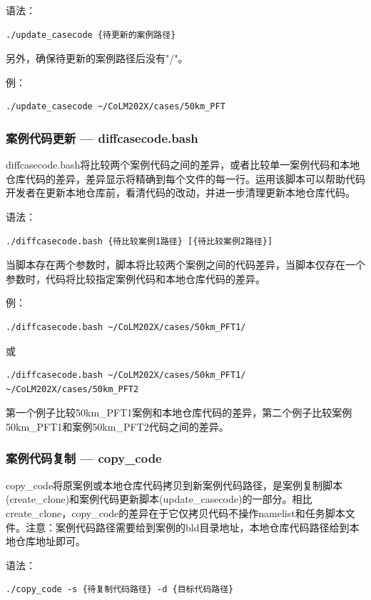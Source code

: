 语法：
\begin{lstlisting}[xleftmargin=2.5em]
./update_casecode {待更新的案例路径}
\end{lstlisting}
另外，确保待更新的案例路径后没有"/"。

例：
\begin{lstlisting}[xleftmargin=2.5em]
./update_casecode ~/CoLM202X/cases/50km_PFT
\end{lstlisting}

\subsubsection{案例代码更新 --- diffcasecode.bash}

diffcasecode.bash将比较两个案例代码之间的差异，或者比较单一案例代码和本地仓库代码的差异，差异显示将精确到每个文件的每一行。运用该脚本可以帮助代码开发者在更新本地仓库前，看清代码的改动，并进一步清理更新本地仓库代码。

语法：

\begin{lstlisting}[xleftmargin=2.5em]
./diffcasecode.bash {待比较案例1路径} [{待比较案例2路径}]
\end{lstlisting}

当脚本存在两个参数时，脚本将比较两个案例之间的代码差异，当脚本仅存在一个参数时，代码将比较指定案例代码和本地仓库代码的差异。

例：
\begin{lstlisting}[xleftmargin=2.5em]
./diffcasecode.bash ~/CoLM202X/cases/50km_PFT1/
\end{lstlisting}
或
\begin{lstlisting}[xleftmargin=2.5em]
./diffcasecode.bash ~/CoLM202X/cases/50km_PFT1/ ~/CoLM202X/cases/50km_PFT2
\end{lstlisting}

第一个例子比较50km\_PFT1案例和本地仓库代码的差异，第二个例子比较案例50km\_PFT1和案例50km\_PFT2代码之间的差异。


\subsubsection{案例代码复制 --- copy\_code}
copy\_code将原案例或本地仓库代码拷贝到新案例代码路径，是案例复制脚本(create\_clone)和案例代码更新脚本(update\_casecode)的一部分。相比create\_clone，copy\_code的差异在于它仅拷贝代码不操作namelist和任务脚本文件。注意：案例代码路径需要给到案例的bld目录地址，本地仓库代码路径给到本地仓库地址即可。

语法：
\begin{lstlisting}[xleftmargin=2.5em]
./copy_code -s {待复制代码路径} -d {目标代码路径}
\end{lstlisting}

